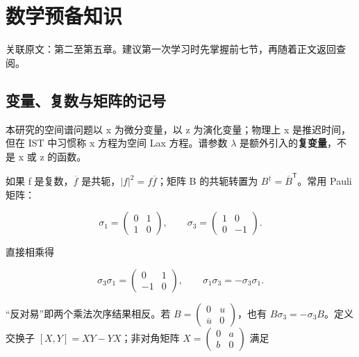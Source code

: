 
\chapter*{数学预备知识}

关联原文：第二至第五章。建议第一次学习时先掌握前七节，再随着正文返回查阅。\par

\section{变量、复数与矩阵的记号}

本研究的空间谱问题以 x 为微分变量，以 z 为演化变量；物理上 x 是推迟时间，但在 IST 中习惯称 x 方程为空间 Lax 方程。谱参数 $\lambda{}$ 是额外引入的\textbf{复变量}，不是 x 或 z 的函数。\par

如果 f 是复数，$\overline f$ 是共轭，$|f|^{2}=f\overline f$；矩阵 B 的共轭转置为 $B^\dagger=\overline B^{\mathsf T}$。常用 Pauli 矩阵：\par

\[
\sigma_1=\begin{pmatrix}0&1\\1&0\end{pmatrix},
\qquad
\sigma_3=\begin{pmatrix}1&0\\0&-1\end{pmatrix}.
\]

直接相乘得\par

\[
\sigma_3\sigma_1=
\begin{pmatrix}0&1\\-1&0\end{pmatrix},
\qquad
\sigma_1\sigma_3=-\sigma_3\sigma_1.
\]

“反对易”即两个乘法次序结果相反。若 $B=\begin{pmatrix}0&u\\\overline u&0\end{pmatrix}$，也有 $B\sigma_3=-\sigma_3 B$。定义交换子 $[X,Y]=XY-YX$；非对角矩阵 $X=\begin{pmatrix}0&a\\b&0\end{pmatrix}$ 满足\par

